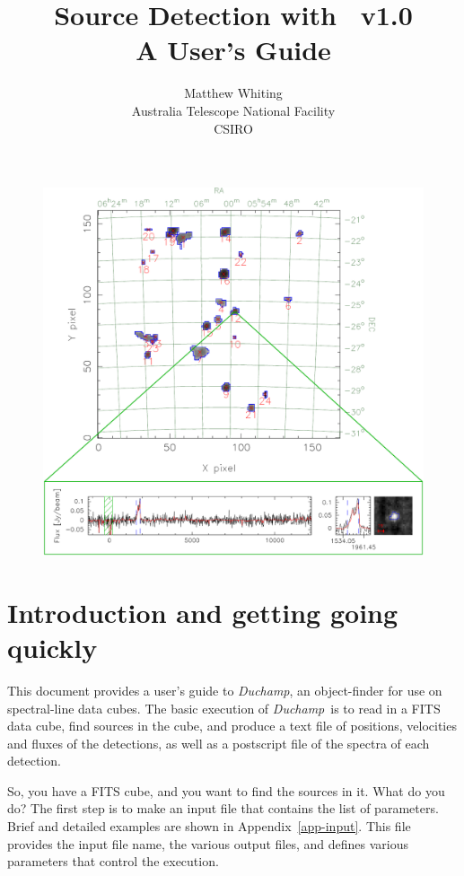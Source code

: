 \documentclass[12pt,a4paper]{article}
\title{Source Detection with \duchamp\ v1.0\\A User's Guide}
\author{Matthew Whiting\\
Australia Telescope National Facility\\CSIRO}
\date{}
\newcommand{\duchamp}{\emph{Duchamp}}
\begin{document}
\maketitle
\thispagestyle{empty}
\begin{figure}[!h]
\begin{center}
\includegraphics[width=\textwidth]{cover_image}
\end{center}
\end{figure}

\newpage
\tableofcontents

\newpage
\section{Introduction and getting going quickly}

This document provides a user's guide to \duchamp, an object-finder
for use on spectral-line data cubes. The basic execution of
\duchamp\ is to read in a FITS data cube, find sources in the cube,
and produce a text file of positions, velocities and fluxes of the
detections, as well as a postscript file of the spectra of each
detection.

So, you have a FITS cube, and you want to find the sources in it. What
do you do? The first step is to make an input file that contains the
list of parameters. Brief and detailed examples are shown in
Appendix~\ref{app-input}. This file provides the input file name, the various
output files, and defines various parameters that control the
execution.
\end{document}
